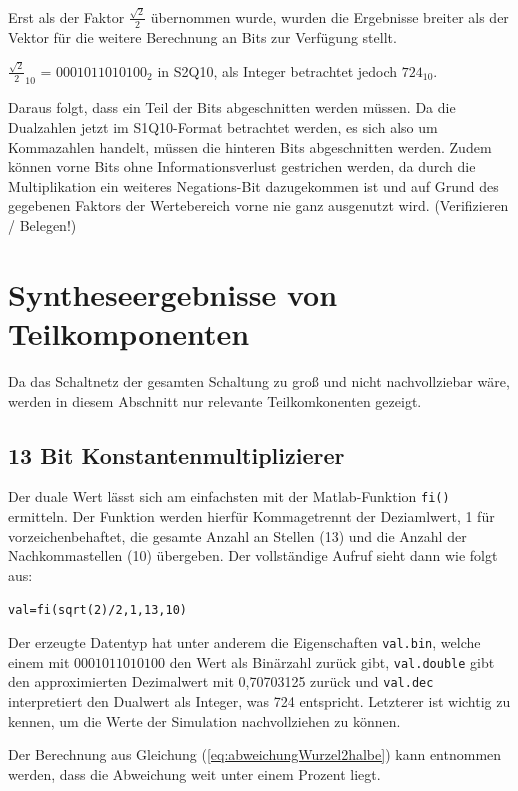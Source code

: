 Erst als der Faktor $\frac{\sqrt{2}}{2}$ übernommen wurde, wurden die Ergebnisse breiter als der Vektor für die weitere Berechnung an Bits zur Verfügung stellt.

${\frac{\sqrt{2}}{2}}_{10}$ = $0001011010100_2$ in S2Q10, als Integer betrachtet jedoch $724_{10}$.

Daraus folgt, dass ein Teil der Bits abgeschnitten werden müssen. Da die Dualzahlen jetzt im S1Q10-Format betrachtet werden, es sich also um Kommazahlen handelt,
müssen die hinteren Bits abgeschnitten werden. Zudem können vorne Bits ohne Informationsverlust gestrichen werden, da durch die Multiplikation ein weiteres 
Negations-Bit dazugekommen ist und auf Grund des gegebenen Faktors der Wertebereich vorne nie ganz ausgenutzt wird. (Verifizieren / Belegen!)



\section{Syntheseergebnisse von Teilkomponenten}\label{sec:Syntheseergebnisse}
Da das Schaltnetz der gesamten Schaltung zu groß und nicht nachvollziebar wäre, werden in diesem Abschnitt nur relevante Teilkomkonenten gezeigt.

\subsection{13 Bit Konstantenmultiplizierer}\label{sec:Konstantenmultiplizierer}

Der duale Wert lässt sich am einfachsten mit der Matlab-Funktion \texttt{fi()} ermitteln. Der Funktion werden hierfür Kommagetrennt der Deziamlwert, 1 für vorzeichenbehaftet,
die gesamte Anzahl an Stellen (13) und die Anzahl der Nachkommastellen (10) übergeben. Der vollständige Aufruf sieht dann wie folgt aus:

\texttt{val=fi(sqrt(2)/2,1,13,10)}

Der erzeugte Datentyp hat unter anderem die Eigenschaften \texttt{val.bin}, welche einem mit $0001011010100$ den Wert als Binärzahl zurück gibt, 
\texttt{val.double} gibt den approximierten Dezimalwert mit 0,70703125 zurück und \texttt{val.dec} interpretiert den Dualwert als Integer, was 724 entspricht.
Letzterer ist wichtig zu kennen, um die Werte der Simulation nachvollziehen zu können.

Der Berechnung aus Gleichung (\ref{eq:abweichungWurzel2halbe}) kann entnommen werden, dass die Abweichung weit unter einem Prozent liegt.

